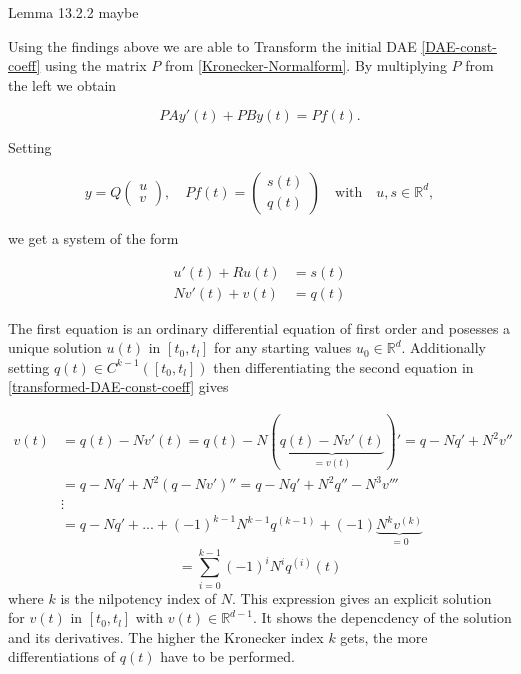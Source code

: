 

Lemma 13.2.2 maybe

Using the findings above we are able to Transform the initial DAE \ref{DAE-const-coeff} using the matrix $P$ from \ref{Kronecker-Normalform}. By multiplying $P$ from the left we obtain

\begin{displaymath}
	P A y'(t) + P B y(t) = P f(t) .
\end{displaymath}

Setting

\begin{displaymath}
	y = Q
	\left(
	\begin{matrix}
		u \\
		v
	\end{matrix}  
	\right) 
	, \quad
	Pf(t) = 
	\left(
	\begin{matrix}
		s(t) \\
		q(t)
	\end{matrix}
	\right)
	\quad \text{with} \quad
	u,s \in \mathbb{R}^d ,
\end{displaymath}

we get a system of the form

\begin{equation}
	\label{transformed-DAE-const-coeff}
	\begin{aligned}
		u'(t) + Ru(t) &= s(t) \\
		Nv'(t) + v(t) &= q(t)
	\end{aligned}
\end{equation}

The first equation is an ordinary differential equation of first order and posesses a unique solution $u(t)$ in $[t_0,t_l]$ for any starting values $u_0 \in \mathbb{R}^d$. Additionally setting $q(t) \in C^{k-1}([t_0,t_l])$ then differentiating the second equation in \ref{transformed-DAE-const-coeff} gives

\begin{displaymath}
	\begin{aligned}
		v(t) &= q(t) - Nv'(t) = q(t) - N(\underbrace{q(t)-Nv'(t)}_{=v(t)})' = q-Nq'+N^2v'' \\
		&= q-Nq'+N^2(q-Nv')'' = q-Nq'+N^2q''-N^3v''' \\
		&\vdots \\
		&= q-Nq'+...+(-1)^{k-1}N^{k-1}q^{(k-1)}+(-1) \underbrace{N^kv^{(k)}}_{=0}
	\end{aligned}
\end{displaymath}
\begin{equation}
	\label{solution-to-transformed-DAE-const-coeff-part2}
	= \sum_{i=0}^{k-1} (-1)^iN^iq^{(i)}(t) 
\end{equation}
where $k$ is the nilpotency index of $N$. This expression gives an explicit solution for $v(t)$ in $[t_0,t_l]$ with $v(t) \in \mathbb{R}^{d-1}$. It shows the depencdency of the solution and its derivatives. The higher the Kronecker index $k$ gets, the more differentiations of $q(t)$ have to be performed.

